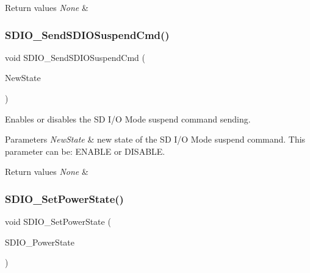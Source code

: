 \begin{DoxyRetVals}{Return values}
{\em None} & \\
\hline
\end{DoxyRetVals}
\mbox{\label{group___s_d_i_o___exported___functions_ga9264137a01a1ab81d03bc80a3b3120fc}} 
\subsubsection{\texorpdfstring{SDIO\_SendSDIOSuspendCmd()}{SDIO\_SendSDIOSuspendCmd()}}
{\footnotesize\ttfamily void S\+D\+I\+O\+\_\+\+Send\+S\+D\+I\+O\+Suspend\+Cmd (\begin{DoxyParamCaption}\item[{\mbox{\hyperlink{group___exported__types_gac9a7e9a35d2513ec15c3b537aaa4fba1}{Functional\+State}}}]{New\+State }\end{DoxyParamCaption})}



Enables or disables the SD I/O Mode suspend command sending. 


\begin{DoxyParams}{Parameters}
{\em New\+State} & new state of the SD I/O Mode suspend command. This parameter can be\+: E\+N\+A\+B\+LE or D\+I\+S\+A\+B\+LE. \\
\hline
\end{DoxyParams}

\begin{DoxyRetVals}{Return values}
{\em None} & \\
\hline
\end{DoxyRetVals}
\mbox{\label{group___s_d_i_o___exported___functions_ga36ecca32b904de74218fbe65cd5f5270}} 
\subsubsection{\texorpdfstring{SDIO\_SetPowerState()}{SDIO\_SetPowerState()}}
{\footnotesize\ttfamily void S\+D\+I\+O\+\_\+\+Set\+Power\+State (\begin{DoxyParamCaption}\item[{uint32\+\_\+t}]{S\+D\+I\+O\+\_\+\+Power\+State }\end{DoxyParamCaption})}



